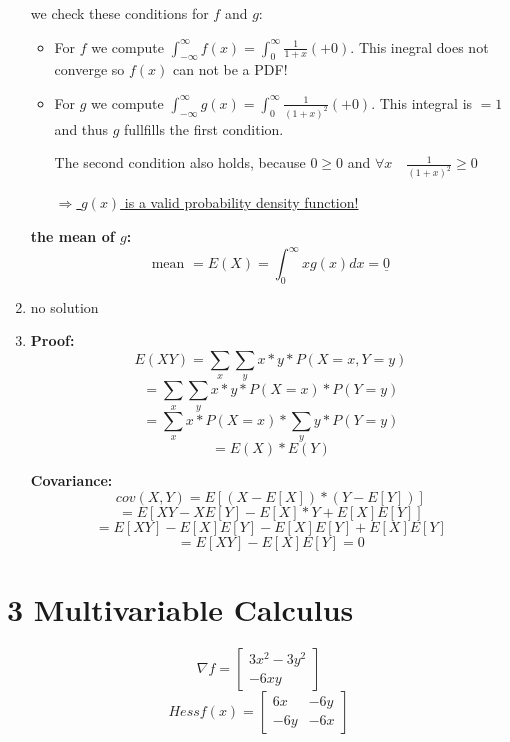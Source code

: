 \documentclass[12pt]{article}
\begin{document}
\begin{enumerate}[1)]
        we check these conditions for $f$ and $g$:
        \begin{itemize}
            \item 
                For $f$ we compute $\int_{-\infty}^{\infty} f(x) = \int_{0}^{\infty} \frac{1}{1+x} (+0)$. This inegral does not converge so $f(x)$ can not be a PDF!
            \item
                For $g$ we compute $\int_{-\infty}^{\infty} g(x) = \int_{0}^{\infty} \frac{1}{(1+x)^2} (+0)$. This integral is $ = 1$ and thus $g$ fullfills the first condition.

                The second condition also holds, because $0 \geq 0$ and $\forall x \quad \frac{1}{(1+x)^2} \geq 0$

                \underline{$\Rightarrow$ $g(x)$ is a valid probability density function!}

        \end{itemize}


        \textbf{the mean of $g$:}
        $$\text{mean } = E(X) = \int_0^{\infty} x g(x) dx = \underline{ 0 }$$ 

    \item
        no solution

    \item
        \textbf{Proof:}\\
        $$ E( X Y ) = \sum_x \sum_y x * y * P(X=x, Y=y) $$
        $$ = \sum_x \sum_y x * y * P(X=x) * P(Y=y)$$
        $$ = \sum_x  x * P(X=x) * \sum_y y * P(Y=y)$$
        $$ = E(X) * E(Y)$$

        \textbf{Covariance:}\\
        $$ cov(X,Y) = E[(X - E[X]) * (Y - E[Y])] $$
        $$ = E[XY - X E[Y] - E[X]*Y + E[X]E[Y]]$$
        $$ = E[XY] - E[X]E[Y] - E[X]E[Y] + E[X]E[Y]$$
        $$ = E[XY] - E[X]E[Y] = 0$$

                
\end{enumerate}



\newpage
\section*{3 Multivariable Calculus}
 
        $$ \nabla f = \begin{bmatrix}3x^2-3y^2\\-6xy\end{bmatrix} $$
        $$ Hess f(x) = \begin{bmatrix} 6x & -6y \\ -6y & -6x \end{bmatrix} $$
        
\end{document}
